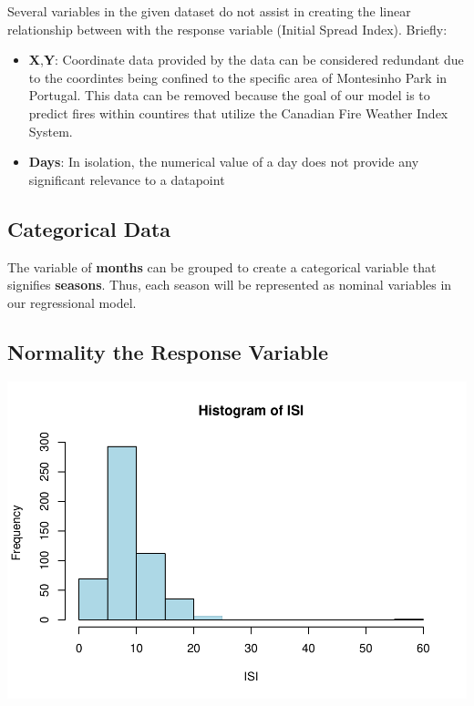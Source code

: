 \documentclass[conference,final,]{IEEEtran}
\makeatletter
\def\maxwidth{\ifdim\Gin@nat@width>\linewidth\linewidth
\else\Gin@nat@width\fi}
\let\Oldincludegraphics\includegraphics
\renewcommand{\includegraphics}[1]{\Oldincludegraphics[width=\maxwidth]{#1}}
\makeatother
\begin{document}
Several variables in the given dataset do not assist in creating the
linear relationship between with the response variable (Initial Spread
Index). Briefly:

\begin{itemize}
\item
  \textbf{X},\textbf{Y}: Coordinate data provided by the data can be
  considered redundant due to the coordintes being confined to the
  specific area of Montesinho Park in Portugal. This data can be removed
  because the goal of our model is to predict fires within countires
  that utilize the Canadian Fire Weather Index System.
\item
  \textbf{Days}: In isolation, the numerical value of a day does not
  provide any significant relevance to a datapoint 
\end{itemize}

\hypertarget{categorical-data}{%
\subsection{Categorical Data}\label{categorical-data}}

The variable of \textbf{months} can be grouped to create a categorical
variable that signifies \textbf{seasons}. Thus, each season will be
represented as nominal variables in our regressional model.

\hypertarget{normality-the-response-variable}{%
\subsection{Normality the Response
Variable}\label{normality-the-response-variable}}

\includegraphics{forest_fires_files/figure-latex/unnamed-chunk-1-1.pdf}
\end{document}
